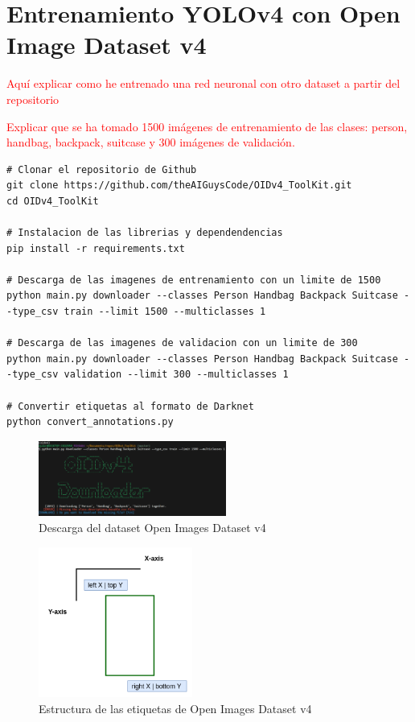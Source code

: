\section{Entrenamiento YOLOv4 con Open Image Dataset v4}
\label{sec:train-openimagesv4}

\textcolor{red}{Aquí explicar como he entrenado una red neuronal con otro dataset a partir del repositorio \cite{OIDv4_ToolKit}}

\textcolor{red}{Explicar que se ha tomado 1500 imágenes de entrenamiento de las clases: person, handbag, backpack, suitcase y 300 imágenes de validación.}

\vspace{0.5cm}
\begin{lstlisting}[language=iPython,caption=Descarga dataset Open Images Dataset v4,captionpos=b,label={lst:download-oidv4}]
# Clonar el repositorio de Github
git clone https://github.com/theAIGuysCode/OIDv4_ToolKit.git
cd OIDv4_ToolKit

# Instalacion de las librerias y dependendencias
pip install -r requirements.txt

# Descarga de las imagenes de entrenamiento con un limite de 1500
python main.py downloader --classes Person Handbag Backpack Suitcase --type_csv train --limit 1500 --multiclasses 1

# Descarga de las imagenes de validacion con un limite de 300
python main.py downloader --classes Person Handbag Backpack Suitcase --type_csv validation --limit 300 --multiclasses 1

# Convertir etiquetas al formato de Darknet
python convert_annotations.py

\end{lstlisting}

\begin{figure}[ht]
\centering
\includegraphics[width=0.55\textwidth]{img/chapters/resultados/datasets/download-oidv4.png}
\caption{\label{fig:download-oidv4}Descarga del dataset Open Images Dataset v4}
\end{figure}

\begin{figure}[ht]
\centering
\includegraphics[width=0.45\textwidth]{img/chapters/resultados/datasets/bbox-oidv4.png}
\caption{\label{fig:bbox-oidv4}Estructura de las etiquetas de Open Images Dataset v4}
\end{figure}

